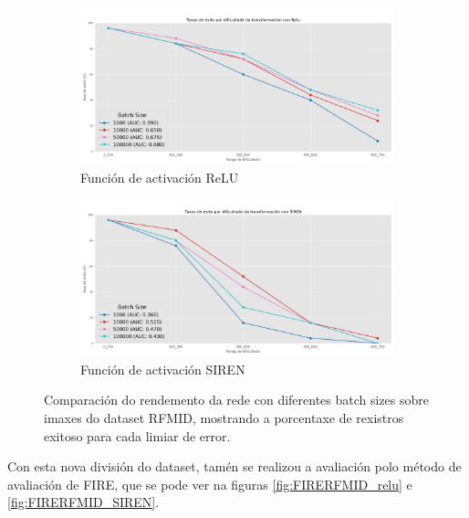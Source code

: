 \begin{figure}[tbp]
    \centering
    \begin{subfigure}[b]{0.5\textwidth}
        \centering
        \includegraphics[width=\textwidth]{imaxes/batchsize/experiment_plot_RFMID_bs_relu.png}
        \caption{Función de activación ReLU}
        \label{fig:batch_size_comparison_relu_rfmid}
    \end{subfigure}\hfill
    \begin{subfigure}[b]{0.5\textwidth}
        \centering
        \includegraphics[width=\textwidth]{imaxes/batchsize/experiment_plot_RFMID_bs_siren.png}
        \caption{Función de activación SIREN}
        \label{fig:batch_size_comparison_siren_rfmid}
    \end{subfigure}
    \caption{Comparación do rendemento da rede con diferentes batch sizes sobre imaxes do dataset RFMID, mostrando a porcentaxe de rexistros exitoso para cada limiar de error.}
    \label{fig:batch_size_comparisons_rfmid}
\end{figure}

Con esta nova división do dataset, tamén se realizou a avaliación polo método de avaliación de FIRE, que se pode ver na figuras \ref{fig:FIRERFMID_relu} e \ref{fig:FIRERFMID_SIREN}.

